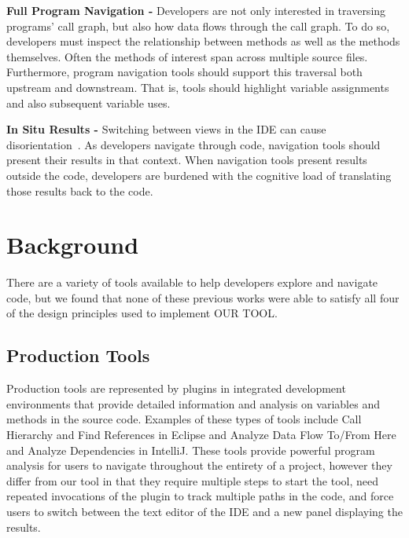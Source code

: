 \documentclass[conference]{IEEEtran}
\newcommand{\toolName}{OUR TOOL}
\begin{document}
\vspace{1em} 
\noindent\textbf{Full Program Navigation -}
Developers are not only interested in traversing programs' call graph, but also how data flows through the call graph.
To do so, developers must inspect the relationship between methods as well as the methods themselves.
Often the methods of interest span across multiple source files.
Furthermore, program navigation tools should support this traversal both upstream and downstream. 
That is, tools should highlight variable assignments and also subsequent variable uses. 

\vspace{1em} 
\noindent\textbf{In Situ Results -}
Switching between views in the IDE can cause disorientation~\cite{deAlwis2006disorient}. As developers navigate through code, navigation tools should present their results in that context. 
When navigation tools present results outside the code, developers are burdened with the cognitive load of translating those results back to the code.

\section{Background}
There are a variety of tools available to help developers explore and navigate code, but we found that none of these previous works were able to satisfy all four of the design principles used to implement \toolName.
\subsection{Production Tools}
Production tools are represented by plugins in integrated development environments that provide detailed information and analysis on variables and methods in the source code. Examples of these types of tools include Call Hierarchy and Find References in Eclipse\cite{Eclipse} and Analyze Data Flow To/From Here and Analyze Dependencies in IntelliJ\cite{IntelliJ}. These tools provide powerful program analysis for users to navigate throughout the entirety of a project, however they differ from our tool in that they require multiple steps to start the tool, need repeated invocations of the plugin to track multiple paths in the code, and force users to switch between the text editor of the IDE and a new panel displaying the results.
\end{document}
